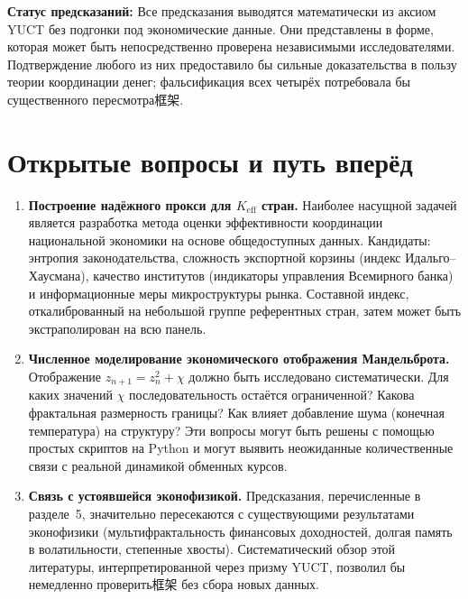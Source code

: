 \documentclass[12pt,a4paper]{article}
\theoremstyle{remark}
\begin{document}
	\textbf{Статус предсказаний:} Все предсказания выводятся математически из аксиом YUCT без подгонки под экономические данные. Они представлены в форме, которая может быть непосредственно проверена независимыми исследователями. Подтверждение любого из них предоставило бы сильные доказательства в пользу теории координации денег; фальсификация всех четырёх потребовала бы существенного пересмотра框架.
	
	\section{Открытые вопросы и путь вперёд}
	
	\begin{enumerate}[label=(\roman*)]
		\item \textbf{Построение надёжного прокси для \(K_{\mathrm{eff}}\) стран.} Наиболее насущной задачей является разработка метода оценки эффективности координации национальной экономики на основе общедоступных данных. Кандидаты: энтропия законодательства, сложность экспортной корзины (индекс Идальго–Хаусмана), качество институтов (индикаторы управления Всемирного банка) и информационные меры микроструктуры рынка. Составной индекс, откалиброванный на небольшой группе референтных стран, затем может быть экстраполирован на всю панель.
		
		\item \textbf{Численное моделирование экономического отображения Мандельброта.} Отображение \(z_{n+1} = z_n^2 + \chi\) должно быть исследовано систематически. Для каких значений \(\chi\) последовательность остаётся ограниченной? Какова фрактальная размерность границы? Как влияет добавление шума (конечная температура) на структуру? Эти вопросы могут быть решены с помощью простых скриптов на Python и могут выявить неожиданные количественные связи с реальной динамикой обменных курсов.
		
		\item \textbf{Связь с устоявшейся эконофизикой.} Предсказания, перечисленные в разделе~5, значительно пересекаются с существующими результатами эконофизики (мультифрактальность финансовых доходностей, долгая память в волатильности, степенные хвосты). Систематический обзор этой литературы, интерпретированной через призму YUCT, позволил бы немедленно проверить框架 без сбора новых данных.
	\end{enumerate}
	
\end{document}
